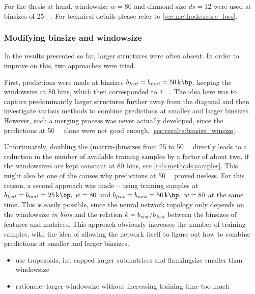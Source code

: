 For the thesis at hand, windowsize $w=80$ and diamond size $ds={12}$ were used at binsizes of \SI{25}{\kilo\bp}.
For technical details please refer to \cref{sec:methods:score_loss}.

\subsubsection{Modifying binsize and windowsize}
In the results presented so far, larger structures were often absent.
In order to improve on this, two approaches were tried.

First, predictions were made at binsizes $b_\mathit{feat} = b_\mathit{mat} = \SI{50}{\kilo\bp}$, 
keeping the windowsize at 80 bins, which then corresponded to \SI{4}{\mega\bp}.
The idea here was to capture predominantly larger structures further away from the diagonal and
then investigate various methods to combine predictions at smaller and larger binsizes.
However, such a merging process was never actually developed,
since the predictions at \SI{50}{\kilo\bp} alone were not good enough, \cref{sec:results:binsize_winsize}.

Unfortunately, doubling the (matrix-)binsizes from 25 to \SI{50}{\kilo\bp} directly leads to a reduction in the number of available training samples by a factor of about two, 
if the windowsizes are kept constant at 80 bins, see \cref{tab:methods:samples}. 
This might also be one of the causes why predictions at \SI{50}{\kilo\bp} proved useless.
For this reason, a second approach was made -- using training samples at $b_\mathit{feat} = b_\mathit{mat} = \SI{25}{\kilo\bp},\;w=80$
and $b_\mathit{feat} = b_\mathit{mat} = \SI{50}{\kilo\bp},\;w=80$ at the same time.
This is easily possible, since the neural network topology only depends on the windowsize \emph{in bins} and the relation $k=b_\mathit{mat}/b_\mathit{feat}$
between the binsizes of features and matrices.
This approach obviously increases the number of training samples,
with the idea of allowing the network itself to figure out how to combine predictions at smaller and larger binsizes.


\begin{itemize}
 \item use trapezoids, i.e. capped larger submatrices and flankingsize smaller than windowsize
 \item rationale: larger windowsize without increasing training time too much
 \end{itemize}
 
 

